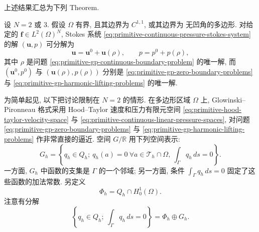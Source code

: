 上述结果汇总为下列 Theorem.

\setcounter{statement}{4}
\renewcommand{\theHstatement}{theorem.\thesection.\arabic{statement}}
\begin{Theorem}\label{thm:primitive-gp-continuous-splitting}
设 $N=2$ 或 $3$. 假设 $\Omega$ 有界, 且其边界为 $C^{1,1}$, 或其边界为
无凹角的多边形. 对给定的 $\mathbf f\in L^2(\Omega)^N$, Stokes 系统
\eqref{eq:primitive-continuous-pressure-stokes-system} 的解 $(\mathbf u,p)$ 可分解为
\[
\mathbf u=\mathbf u^0+\mathbf u(\rho),
\qquad p=p^0+p(\rho),
\]
其中 $\rho$ 是问题 \eqref{eq:primitive-gp-continuous-boundary-problem} 的唯一解,
而 $(\mathbf u^0,p^0)$ 与 $(\mathbf u(\rho),p(\rho))$ 分别是
\eqref{eq:primitive-gp-zero-boundary-problems} 与
\eqref{eq:primitive-gp-harmonic-lifting-problems} 的唯一解.
\end{Theorem}

为简单起见, 以下把讨论限制在 $N=2$ 的情形. 在多边形区域 $\Omega$ 上,
Glowinski--Pironneau 格式采用 Hood--Taylor 速度和压力有限元空间
\eqref{eq:primitive-hood-taylor-velocity-space} 与
\eqref{eq:primitive-continuous-linear-pressure-spaces}, 对问题
\eqref{eq:primitive-gp-zero-boundary-problems} 与
\eqref{eq:primitive-gp-harmonic-lifting-problems} 作非常直接的逼近.
空间 $G/\mathbb R$ 用下列空间表示:
\begin{equation}\label{eq:primitive-gp-discrete-boundary-space}
G_h=\left\{q_h\in Q_h;
\ q_h(a)=0\ \forall a\in\mathcal T_h\cap\Omega,
\ \int_\Gamma q_h\,ds=0\right\}.
\end{equation}
一方面, $G_h$ 中函数的支集是 $\Gamma$ 的一个邻域; 另一方面, 条件
$\int_\Gamma q_h\,ds=0$ 固定了这些函数的加法常数. 另定义
\begin{equation}\label{eq:primitive-gp-discrete-interior-space}
\Phi_h=Q_h\cap H_0^1(\Omega).
\end{equation}
注意有分解
\[
\left\{q_h\in Q_h;\ \int_\Gamma q_h\,ds=0\right\}
=\Phi_h\oplus G_h.
\]

